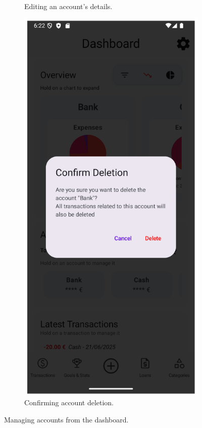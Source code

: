 \documentclass[a4paper,12pt]{article}
\begin{document}
\begin{figure}[H]
\begin{subfigure}[b]{0.23\textwidth}
        \caption{Editing an account's details.}
        \label{fig:dashboard_edit_account}
    \end{subfigure}
    \hfill
    \begin{subfigure}[b]{0.23\textwidth}
        \includegraphics[width=\textwidth]{account_deletion_dialog.png}
        \caption{Confirming account deletion.}
        \label{fig:dashboard_delete_account_confirm}
    \end{subfigure}
    \caption{Managing accounts from the dashboard.}
    \label{fig:dashboard_account_management}
\end{figure}
\end{document}
